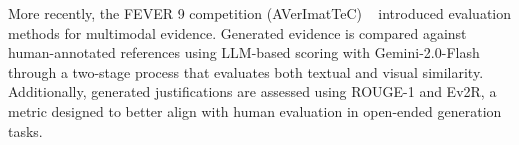 More recently, the FEVER 9 competition (AVerImatTeC) ~\cite{Cao2025May} introduced evaluation methods for multimodal evidence. Generated evidence is compared against human-annotated references using LLM-based scoring with Gemini-2.0-Flash through a two-stage process that evaluates both textual and visual similarity. Additionally, generated justifications are assessed using ROUGE-1 and Ev2R, a metric designed to better align with human evaluation in open-ended generation tasks.


































